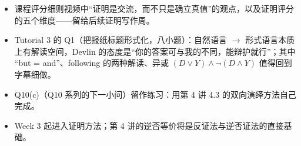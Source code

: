 \documentclass[UTF8,a4paper,11pt]{ctexart}
\begin{document}
\begin{calcbox}
\begin{itemize}
  \item 课程评分细则视频中“证明是交流，而不只是确立真值”的观点，以及证明评分的五个维度——留给后续证明写作周。
  \item Tutorial 3 的 Q1（把报纸标题形式化，八小题）：自然语言 $\rightarrow$ 形式语言本质上有解读空间，Devlin 的态度是“你的答案可与我的不同，能辩护就行”；其中 “but = and”、following 的两种解读、异或 $(D \lor Y) \land \neg(D \land Y)$ 值得回到字幕细做。
  \item Q10(c)（Q10 系列的下一小问）留作练习：用第 4 讲 4.3 的双向演绎方法自己完成。
  \item Week 3 起进入证明方法；第 4 讲的逆否等价将是反证法与逆否证法的直接基础。
\end{itemize}
\end{calcbox}
\end{document}
